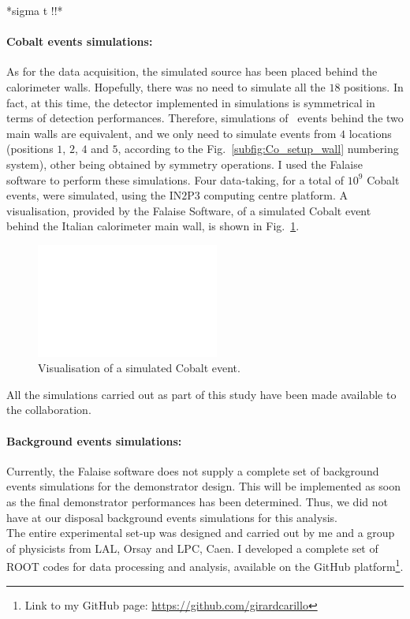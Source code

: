 *sigma t !!*

\paragraph{Cobalt events simulations:}
As for the data acquisition, the simulated source has been placed behind the calorimeter walls.
Hopefully, there was no need to simulate all the $18$ positions.
In fact, at this time, the detector implemented in simulations is symmetrical in terms of detection performances.
Therefore, simulations of \Co\ events behind the two main walls are equivalent, and we only need to simulate events from $4$ locations (positions $1$, $2$, $4$ and $5$, according to the Fig.~\ref{subfig:Co_setup_wall} numbering system), other being obtained by symmetry operations.
I used the Falaise software to perform these simulations.
Four data-taking, for a total of $10^{9}$ Cobalt events, were simulated, using the IN$2$P$3$ computing centre platform.
A visualisation, provided by the Falaise Software, of a simulated Cobalt event behind the Italian calorimeter main wall, is shown in Fig.~\ref{fig:Co_visu}.
\begin{figure}[h]
  \centering
  \includegraphics[width=6cm]{commissioning/fig_commissioning/Co_visu.pdf}
  \caption{Visualisation of a simulated Cobalt event.
\label{fig:Co_visu}}
\end{figure}
All the simulations carried out as part of this study have been made available to the collaboration.

\paragraph{Background events simulations:}
Currently, the Falaise software does not supply a complete set of background events simulations for the demonstrator design.
This will be implemented as soon as the final demonstrator performances has been determined.
Thus, we did not have at our disposal background events simulations for this analysis.\\

The entire experimental set-up was designed and carried out by me and a group of physicists from LAL, Orsay and LPC, Caen.
I developed a complete set of ROOT codes for data processing and analysis, available on the GitHub platform\footnote{Link to my GitHub page: \href{https://github.com/girardcarillo}{https://github.com/girardcarillo}}.

